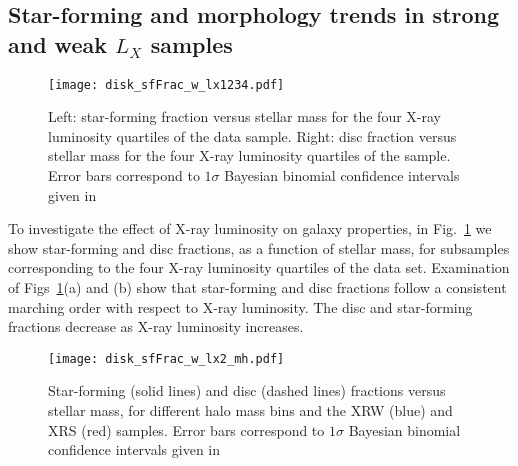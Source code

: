 \subsection{Star-forming and morphology trends in strong and weak
  $L_X$ samples}

\begin{figure}[!ht]
  \centering
  \texttt{[image: disk\_sfFrac\_w\_lx1234.pdf]}
  \caption{Left: star-forming fraction versus stellar mass for the
    four X-ray luminosity quartiles of the data sample.  Right: disc
    fraction versus stellar mass for the four X-ray luminosity
    quartiles of the sample.  Error bars correspond to $1\sigma$
    Bayesian binomial confidence intervals given in \citet{cameron2011}}
  \label{fig:disk_sfFrac_w_lx1234}
\end{figure}

To investigate the effect of X-ray luminosity on galaxy properties, in
Fig.~\ref{fig:disk_sfFrac_w_lx1234} we show star-forming and disc
fractions, as a function of stellar mass, for subsamples corresponding
to the four X-ray luminosity quartiles of the data set.  Examination
of Figs~\ref{fig:disk_sfFrac_w_lx1234}(a) and (b) show that
star-forming and disc fractions follow a consistent marching order
with respect to X-ray luminosity.  The disc and star-forming fractions
decrease as X-ray luminosity increases.

\begin{figure}[!ht]
  \centering
  \texttt{[image: disk\_sfFrac\_w\_lx2\_mh.pdf]}
  \caption{Star-forming (solid lines) and disc (dashed lines)
    fractions versus stellar mass, for different halo mass bins and
    the XRW (blue) and XRS (red) samples.  Error bars correspond to
    $1\sigma$ Bayesian binomial confidence intervals given in \citet{cameron2011}}
  \label{fig:disk_sfFrac_w_lx2_mh}
\end{figure}

